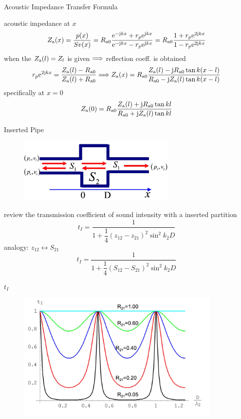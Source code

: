 \documentclass[9pt,mathserif]{beamer}
\begin{document}
\begin{frame}{Acoustic Impedance Transfer Formula}
	\begin{outline}
		\1 acoustic impedance at $x$
		$$
			Z_\text{a}(x) = \frac{p(x)}{Sv(x)} 
			= R_\text{a0}\frac{
			\mathrm{e}^{-\mathrm{j} kx}+r_p \mathrm{e}^{\mathrm{j} kx}}{\mathrm{e}^{-\mathrm{j} kx}-r_p\mathrm{e}^{\mathrm{j} kx}}
			= R_\text{a0}\frac{
			1+r_p \mathrm{e}^{2\mathrm{j} kx}}{1-r_p\mathrm{e}^{2\mathrm{j} kx}}
		$$
		\1 when the $Z_\text{a}(l) = Z_l$ is given $\Longrightarrow$ reflection coeff. is 
		obtained
		$$ r_p \mathrm{e}^{2\mathrm{j} kx} = \frac{Z_\text{a}(l)-R_\text{a0}}{Z_\text{a}(l)+R_\text{a0}}
		\Longrightarrow
		Z_\text{a}(x) = R_\text{a0} \frac{Z_\text{a}(l)-\mathrm{j} R_\text{a0}\tan k(x-l)}{
			R_\text{a0}-\mathrm{j} Z_\text{a}(l)\tan k(x-l)}
		$$
		\1 specifically at $x=0$
		$$Z_\text{a}(0) = R_\text{a0}\frac{Z_\text{a}(l)+\mathrm{j} R_\text{a0}\tan kl}{
			R_\text{a0}+\mathrm{j} Z_\text{a}(l)\tan kl}$$
	\end{outline}
\end{frame}

\begin{frame}{Inserted Pipe}
	\begin{figure}
		\centering
		\includegraphics[width=0.7\textwidth]{img/duct/insertedPipe.jpg}
	\end{figure}
	\begin{outline}
		\1 review the transmission coefficient of sound intensity with a 
		inserted partition
		$$t_I = \frac{1}{1+\dfrac14 (z_{12}-z_{21})^2\sin^2 k_2D}$$
		\1 analogy: $z_{12}\leftrightarrow S_{21}$
		$$t_I = \frac{1}{1+\dfrac14 (S_{12}-S_{21})^2\sin^2 k_2D}$$
	\end{outline}
\end{frame}

\begin{frame}{$t_I$}
	\begin{figure}
		\centering
		\includegraphics[width=0.9\textwidth]{img/idealfluid/planeVertIncPartitionTi.jpg}
	\end{figure}
\end{frame}
\end{document}
